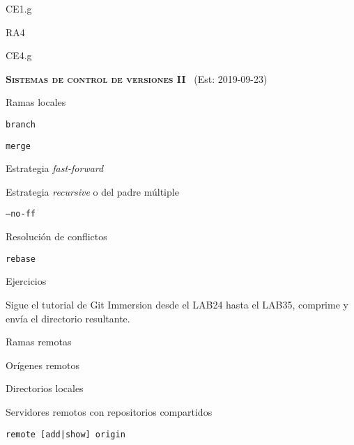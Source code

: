 \begin{longenum}
\begin{longenum}
\begin{longenum}
\begin{longenum}
\begin{longenum}
                    \item CE1.g
                \end{longenum}
                \item RA4
                \begin{longenum}
                    \item CE4.g
                \end{longenum}
            \end{longenum}
        \end{longenum}
    \end{longenum}
    \item \textbf{\textsc{Sistemas de control de versiones II}} \ (Est: 2019-09-23)
    \begin{longenum}
        \item Ramas locales
        \begin{longenum}
            \item \texttt{branch}
            \item \texttt{merge}
            \begin{longenum}
                \item Estrategia \textit{fast-forward}
                \item Estrategia \textit{recursive} o del padre múltiple
                \item \texttt{--no-ff}
            \end{longenum}
            \item Resolución de conflictos
            \item \texttt{rebase}
            \item Ejercicios
            \begin{longenum}
                \item Sigue el tutorial de Git Immersion desde el LAB24 hasta el LAB35, comprime y envía el directorio resultante.
            \end{longenum}
        \end{longenum}
        \item Ramas remotas
        \begin{longenum}
            \item Orígenes remotos
            \begin{longenum}
                \item Directorios locales
                \item Servidores remotos con repositorios compartidos
                \item \texttt{remote [add|show] origin}

\end{longenum}
\end{longenum}
\end{longenum}
\end{longenum}
